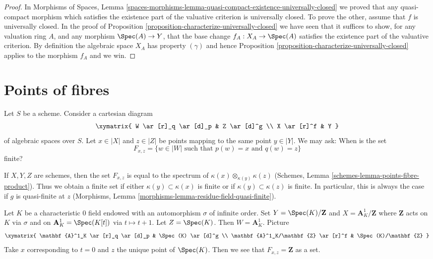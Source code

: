 \begin{proof}
In
Morphisms of Spaces,
Lemma \ref{spaces-morphisms-lemma-quasi-compact-existence-universally-closed}
we proved that any quasi-compact morphism which satisfies the existence
part of the valuative criterion is universally closed.
To prove the other, assume that $f$ is universally closed.
In the proof of
Proposition \ref{proposition-characterize-universally-closed}
we have seen that it suffices to show, for any valuation ring $A$,
and any morphism $\Spec(A) \to Y$, that the base change
$f_A : X_A \to \Spec(A)$ satisfies the existence part of the valuative
criterion. By definition the algebraic space $X_A$ has property $(\gamma)$
and hence
Proposition \ref{proposition-characterize-universally-closed}
applies to the morphism $f_A$ and we win.
\end{proof}





\section{Points of fibres}
\label{section-points-fibres}

\noindent
Let $S$ be a scheme. Consider a cartesian diagram
\begin{equation}
\label{equation-points-fibres}
\xymatrix{
W \ar[r]_q \ar[d]_p & Z \ar[d]^g \\
X \ar[r]^f & Y
}
\end{equation}
of algebraic spaces over $S$. Let $x \in |X|$ and $z \in |Z|$
be points mapping to the same point $y \in |Y|$. We may ask:
When is the set
\begin{equation}
\label{equation-fibre}
F_{x, z} = \{ w \in |W| \text{ such that }p(w) = x\text{ and }q(w) = z\}
\end{equation}
finite?

\begin{example}
\label{example-schemes}
If $X, Y, Z$ are schemes, then the set $F_{x, z}$
is equal to the spectrum of $\kappa(x) \otimes_{\kappa(y)} \kappa(z)$
(Schemes, Lemma \ref{schemes-lemma-points-fibre-product}). Thus we
obtain a finite set if either $\kappa(y) \subset \kappa(x)$ is finite or if
$\kappa(y) \subset \kappa(z)$ is finite. In particular, this is always
the case if $g$ is quasi-finite at $z$ (Morphisms, Lemma
\ref{morphisms-lemma-residue-field-quasi-finite}).
\end{example}

\begin{example}
\label{example-not-finite}
Let $K$ be a characteristic $0$ field endowed with an automorphism
$\sigma$ of infinite order. Set $Y = \Spec(K)/\mathbf{Z}$ and
$X = \mathbf{A}^1_K/\mathbf{Z}$ where $\mathbf{Z}$ acts on $K$ via $\sigma$
and on $\mathbf{A}^1_K = \Spec(K[t])$ via $t \mapsto t + 1$.
Let $Z = \Spec(K)$. Then $W = \mathbf{A}^1_K$. Picture
$$
\xymatrix{
\mathbf{A}^1_K \ar[r]_q \ar[d]_p & \Spec(K) \ar[d]^g \\
\mathbf{A}^1_K/\mathbf{Z} \ar[r]^f & \Spec(K)/\mathbf{Z}
}
$$
Take $x$ corresponding to $t = 0$ and $z$ the unique point of $\Spec(K)$.
Then we see that $F_{x, z} = \mathbf{Z}$ as a set.
\end{example}

